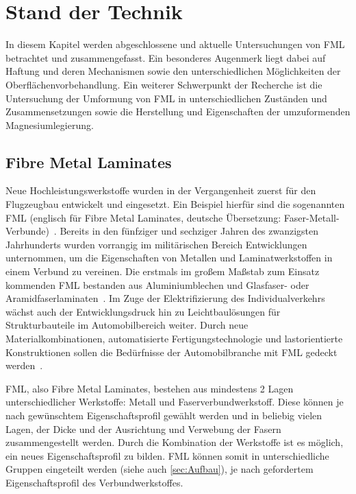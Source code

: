 \chapter{Stand der Technik}\label{cha:Stand}

In diesem Kapitel werden abgeschlossene und aktuelle Untersuchungen von FML betrachtet und zusammengefasst.
Ein besonderes Augenmerk liegt dabei auf Haftung und deren Mechanismen sowie den unterschiedlichen Möglichkeiten der Oberflächenvorbehandlung.
Ein weiterer Schwerpunkt der Recherche ist die Untersuchung der Umformung von FML in unterschiedlichen Zuständen und Zusammensetzungen sowie die Herstellung und Eigenschaften der umzuformenden Magnesiumlegierung.

\section{Fibre Metal Laminates}\label{sec:FML}

Neue Hochleistungswerkstoffe wurden in der Vergangenheit zuerst für den Flugzeugbau entwickelt und eingesetzt.
Ein Beispiel hierfür sind die sogenannten FML (englisch für Fibre Metal Laminates, deutsche Übersetzung: Faser-Metall-Verbunde)~.
Bereits in den fünfziger und sechziger Jahren des zwanzigsten Jahrhunderts wurden vorrangig im militärischen Bereich Entwicklungen unternommen, um die Eigenschaften von Metallen und Laminatwerkstoffen in einem Verbund zu vereinen.
Die erstmals im großem Maßstab zum Einsatz kommenden FML bestanden aus Aluminiumblechen und Glasfaser- oder Aramidfaserlaminaten~\cite{Vogelesang.2000}.
Im Zuge der Elektrifizierung des Individualverkehrs wächst auch der Entwicklungsdruck hin zu Leichtbaulösungen für Strukturbauteile im Automobilbereich weiter.
Durch neue Materialkombinationen, automatisierte Fertigungstechnologie und lastorientierte Konstruktionen sollen die Bedürfnisse der Automobilbranche mit FML gedeckt werden~\cite{Wollmann.2018}.

FML, also Fibre Metal Laminates, bestehen aus mindestens 2 Lagen unterschiedlicher Werkstoffe: Metall und Faserverbundwerkstoff.
Diese können je nach gewünschtem Eigenschaftsprofil gewählt werden und in beliebig vielen Lagen, der Dicke und der Ausrichtung und Verwebung der Fasern zusammengestellt werden.
Durch die Kombination der Werkstoffe ist es möglich, ein neues Eigenschaftsprofil zu bilden.
FML können somit in unterschiedliche Gruppen eingeteilt werden (siehe auch \autoref{sec:Aufbau}), je nach gefordertem Eigenschaftsprofil des Verbundwerkstoffes.

